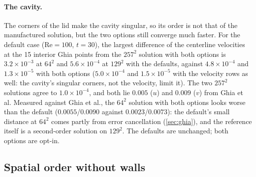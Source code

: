 \documentclass[11pt,a4paper]{article}
\newcommand{\Rey}{\mathrm{Re}}
\begin{document}
\paragraph{The cavity.}  The corners of the lid make the cavity singular, so its order is not that of the manufactured solution, but the two options still converge much faster.  For the default case ($\Rey=100$, $t=30$), the largest difference of the centerline velocities at the 15 interior Ghia points from the $257^2$ solution with both options is $3.2\times10^{-3}$ at $64^2$ and $5.6\times10^{-4}$ at $129^2$ with the defaults, against $4.8\times10^{-4}$ and $1.3\times10^{-5}$ with both options ($5.0\times10^{-4}$ and $1.5\times10^{-5}$ with the velocity rows as well: the cavity's singular corners, not the velocity, limit it).  The two $257^2$ solutions agree to $1.0\times10^{-4}$, and both lie $0.005$ ($u$) and $0.009$ ($v$) from Ghia et al.  Measured against Ghia et al., the $64^2$ solution with both options looks worse than the default ($0.0055$/$0.0090$ against $0.0023$/$0.0073$): the default's small distance at $64^2$ comes partly from error cancellation (\cref{sec:ghia}), and the reference itself is a second-order solution on $129^2$.  The defaults are unchanged; both options are opt-in.

\subsection{Spatial order without walls}
\label{sec:periodic-verification}
\end{document}
